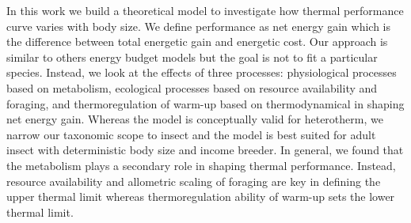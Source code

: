 In this work we build a theoretical model to investigate how thermal performance curve varies with body size.  %
We define performance as net energy gain which is the difference between total energetic gain and energetic cost. 
Our approach is similar to others energy budget models \citep[e.g. Niche Mapper\textsuperscript{TM} or][]{Kooijman2009} but the goal is not to fit a particular species.
Instead, we look at the effects of three processes: physiological processes based on metabolism, ecological processes based on resource availability and foraging, and  thermoregulation of warm-up based on thermodynamical in shaping net energy gain.
Whereas the model is conceptually valid for heterotherm, we narrow our taxonomic scope to insect and the model is best suited for adult insect with deterministic body size and income breeder. 
In general, we found that the metabolism plays a secondary role in shaping thermal performance.
Instead, resource availability and allometric scaling of foraging are key in defining the upper thermal limit whereas thermoregulation ability of warm-up sets the lower thermal limit.
